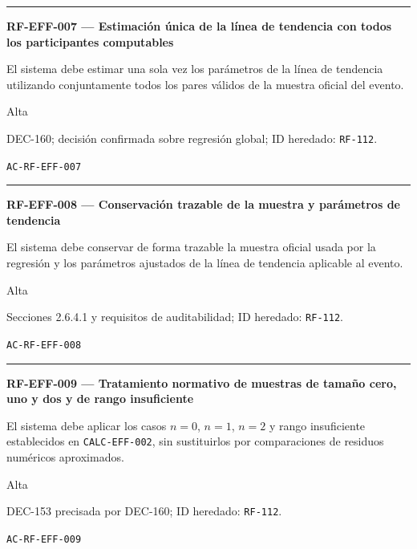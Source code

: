 \documentclass[10pt,letterpaper]{article}
\begin{document}
\vspace{0.25em}\hrule\vspace{0.65em}
\noindent\textbf{RF-EFF-007 --- Estimación única de la línea de tendencia con todos los participantes computables}\par
\begin{description}[style=nextline,leftmargin=3.15cm,labelwidth=2.8cm,font=\normalfont\bfseries]
\item[Obligación] El sistema debe estimar una sola vez los parámetros de la línea de tendencia utilizando conjuntamente todos los pares válidos de la muestra oficial del evento.
\item[Prioridad] Alta
\item[Procedencia] DEC-160; decisión confirmada sobre regresión global; ID heredado: \texttt{RF-112}.
\item[Verificación] \texttt{AC-RF-EFF-007}
\end{description}
\vspace{0.25em}\hrule\vspace{0.65em}
\noindent\textbf{RF-EFF-008 --- Conservación trazable de la muestra y parámetros de tendencia}\par
\begin{description}[style=nextline,leftmargin=3.15cm,labelwidth=2.8cm,font=\normalfont\bfseries]
\item[Obligación] El sistema debe conservar de forma trazable la muestra oficial usada por la regresión y los parámetros ajustados de la línea de tendencia aplicable al evento.
\item[Prioridad] Alta
\item[Procedencia] Secciones 2.6.4.1 y requisitos de auditabilidad; ID heredado: \texttt{RF-112}.
\item[Verificación] \texttt{AC-RF-EFF-008}
\end{description}
\vspace{0.25em}\hrule\vspace{0.65em}
\noindent\textbf{RF-EFF-009 --- Tratamiento normativo de muestras de tamaño cero, uno y dos y de rango insuficiente}\par
\begin{description}[style=nextline,leftmargin=3.15cm,labelwidth=2.8cm,font=\normalfont\bfseries]
\item[Obligación] El sistema debe aplicar los casos $n=0$, $n=1$, $n=2$ y rango insuficiente establecidos en \texttt{CALC-EFF-002}, sin sustituirlos por comparaciones de residuos numéricos aproximados.
\item[Prioridad] Alta
\item[Procedencia] DEC-153 precisada por DEC-160; ID heredado: \texttt{RF-112}.
\item[Verificación] \texttt{AC-RF-EFF-009}
\end{description}
\end{document}
